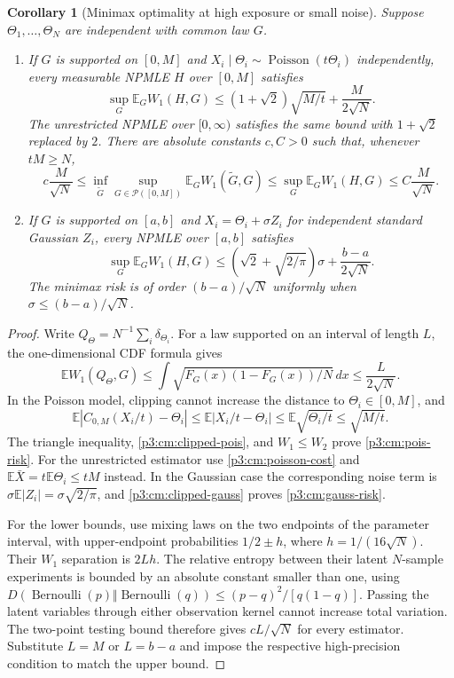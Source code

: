 \documentclass[11pt,a4paper]{article}
\newtheorem{corollary}[theorem]{Corollary}
\theoremstyle{definition}
\theoremstyle{remark}
\numberwithin{equation}{section}
\begin{document}
\begin{corollary}[Minimax optimality at high exposure or small noise]
\label{p3:cm:risk}
Suppose $\Theta_1,\ldots,\Theta_N$ are independent with common law $G$.
\begin{enumerate}[label=(\roman*),leftmargin=*]
\item If $G$ is supported on $[0,M]$ and
$X_i\mid\Theta_i\sim\operatorname{Poisson}(t\Theta_i)$ independently,
every measurable NPMLE $H$ over $[0,M]$ satisfies
\begin{equation}\label{p3:cm:pois-risk}
 \sup_G\mathbb E_GW_1(H,G)
 \le(1+\sqrt2)\sqrt{M/t}+\frac{M}{2\sqrt N}.
\end{equation}
The unrestricted NPMLE over $[0,\infty)$ satisfies the same bound with
$1+\sqrt2$ replaced by $2$.
There are absolute constants $c,C>0$ such that, whenever $tM\ge N$,
\[
 c\frac M{\sqrt N}\le
 \inf_{\widetilde G}\sup_{G\in\mathcal P([0,M])}
       \mathbb E_GW_1(\widetilde G,G)
 \le\sup_G\mathbb E_GW_1(H,G)\le C\frac M{\sqrt N}.
\]
\item If $G$ is supported on $[a,b]$ and
$X_i=\Theta_i+\sigma Z_i$ for independent standard Gaussian $Z_i$,
every NPMLE over $[a,b]$ satisfies
\begin{equation}\label{p3:cm:gauss-risk}
 \sup_G\mathbb E_GW_1(H,G)
 \le(\sqrt2+\sqrt{2/\pi})\sigma
                         +\frac{b-a}{2\sqrt N}.
\end{equation}
The minimax risk is of order $(b-a)/\sqrt N$ uniformly when
$\sigma\le(b-a)/\sqrt N$.
\end{enumerate}
\end{corollary}

\begin{proof}
Write $Q_\Theta=N^{-1}\sum_i\delta_{\Theta_i}$.  For a law supported
on an interval of length $L$, the one-dimensional CDF formula gives
\[
 \mathbb EW_1(Q_\Theta,G)
 \le\int\sqrt{F_G(x)(1-F_G(x))/N}\,dx\le\frac L{2\sqrt N}.
\]
In the Poisson model, clipping cannot increase the distance to
$\Theta_i\in[0,M]$, and
\[
 \mathbb E|C_{0,M}(X_i/t)-\Theta_i|
 \le\mathbb E|X_i/t-\Theta_i|
 \le\mathbb E\sqrt{\Theta_i/t}\le\sqrt{M/t}.
\]
The triangle inequality, \eqref{p3:cm:clipped-pois}, and $W_1\le W_2$
prove \eqref{p3:cm:pois-risk}.  For the unrestricted estimator use
\eqref{p3:cm:poisson-cost} and
$\mathbb E\bar X=t\mathbb E\Theta_i\le tM$ instead.
In the Gaussian case the corresponding noise term is
$\sigma\mathbb E|Z_i|=\sigma\sqrt{2/\pi}$, and
\eqref{p3:cm:clipped-gauss} proves \eqref{p3:cm:gauss-risk}.

For the lower bounds, use mixing laws on the two endpoints of the
parameter interval, with upper-endpoint probabilities
$1/2\pm h$, where $h=1/(16\sqrt N)$.  Their $W_1$ separation is
$2Lh$.  The relative entropy between their latent $N$-sample experiments
is bounded by an absolute constant smaller than one, using
$D(\operatorname{Bernoulli}(p)\Vert\operatorname{Bernoulli}(q))
\le(p-q)^2/[q(1-q)]$.  Passing the latent variables through either
observation kernel cannot increase total variation.  The two-point
testing bound therefore gives $cL/\sqrt N$ for every estimator.
Substitute $L=M$ or $L=b-a$ and impose the respective high-precision
condition to match the upper bound.
\end{proof}
\end{document}
